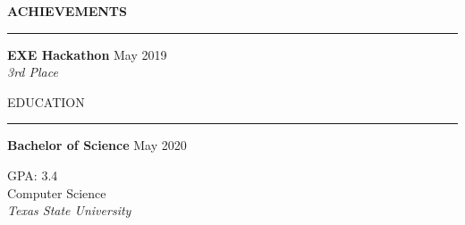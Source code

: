 \documentclass[letterpaper, 10pt]{resume}
\renewenvironment{rSection}[1]{
\sectionskip
\textcolor{blue-violet}{\MakeUppercase{#1}}
\sectionlineskip
\hrule
\begin{list}{}{
	\setlength{\leftmargin}{1.5em}
}
	\item[]
}{
\end{list}
}
\begin{document}
\begin{multicols}{2}
\begin{rSection}{\bf Achievements}
	\begin{flushleft}
	{\bf EXE Hackathon} \hfill May 2019 \\
	{\raggedleft \em 3rd Place\\}
	\end{flushleft}
	
\end{rSection}

\begin{rSection}{Education}
\color{black}

	\begin{flushleft}
	{{\bf Bachelor of Science} \hfill May 2020 } \\
	\end{flushleft}
	{\raggedleft GPA: 3.4 \\ Computer Science \\ {\em Texas State University} \\}
	
\end{rSection}


\end{multicols}
\end{document}
